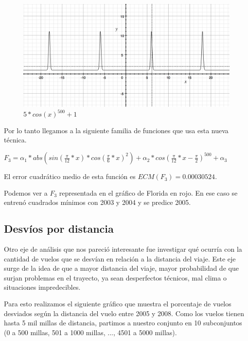 \begin{figure}[h!]
  \begin{center}
	\includegraphics[scale=0.4]{img/cos500.png}
	\caption{$5*cos(x)^{500} + 1$}
  \end{center}
\end{figure}

Por lo tanto llegamos a la siguiente familia de funciones que usa esta nueva t\'ecnica.

$F_3 = \alpha_1 * abs(sin(\frac{\pi}{12}*x) * cos(\frac{\pi}{6}*x)^2) + \alpha_2 * cos(\frac{\pi}{12}*x - \frac{\pi}{2})^{500} + \alpha_3$

El error cuadr\'atico medio de esta funci\'on es $ECM(F_3) = 0.00030524$.

Podemos ver a $F_3$ representada en el gr\'afico de Florida en rojo. En ese caso se entren\'o cuadrados m\'inimos con 2003 y 2004 y se predice 2005.

\subsection{Desv\'ios por distancia}

Otro eje de an\'alisis que nos pareci\'o interesante fue investigar qu\'e ocurr\'ia con la cantidad de vuelos que se desv\'ian en relaci\'on a la distancia del viaje. Este eje surge de la idea de que a mayor distancia del viaje, mayor probabilidad de que surjan problemas en el trayecto, ya sean desperfectos t\'ecnicos, mal clima o situaciones impredecibles.

Para esto realizamos el siguiente gr\'afico que muestra el porcentaje de vuelos desviados seg\'un la distancia del vuelo entre 2005 y 2008. Como los vuelos tienen hasta 5 mil millas de distancia, partimos a nuestro conjunto en 10 subconjuntos (0 a 500 millas, 501 a 1000 millas, ..., 4501 a 5000 millas).

